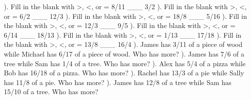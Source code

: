 \documentclass{article}%
\begin{document}
\newline%
\newline%
). Fill in the blank with >, <, or = 8/11 \_\_\_ 3/2%
\newline%
\newline%
). Fill in the blank with >, <, or = 6/2 \_\_\_ 12/3%
\newline%
\newline%
). Fill in the blank with >, <, or = 18/8 \_\_\_ 5/16%
\newline%
\newline%
). Fill in the blank with >, <, or = 12/3 \_\_\_ 9/5%
\newline%
\newline%
). Fill in the blank with >, <, or = 6/14 \_\_\_ 18/13%
\newline%
\newline%
). Fill in the blank with >, <, or = 1/13 \_\_\_ 17/18%
\newline%
\newline%
). Fill in the blank with >, <, or = 13/8 \_\_\_ 16/4%
\newline%
\newline%
). James has 3/11 of a piece of wood while Michael has 6/17 of a piece of wood. Who has more?%
\newline%
\newline%
). James has 7/6 of a tree while Sam has 1/4 of a tree. Who has more?%
\newline%
\newline%
). Alex has 5/4 of a pizza while Bob has 16/18 of a pizza. Who has more?%
\newline%
\newline%
). Rachel has 13/3 of a pie while Sally has 11/8 of a pie. Who has more?%
\newline%
\newline%
). James has 12/8 of a tree while Sam has 15/10 of a tree. Who has more?%
\newline%
\end{document}
